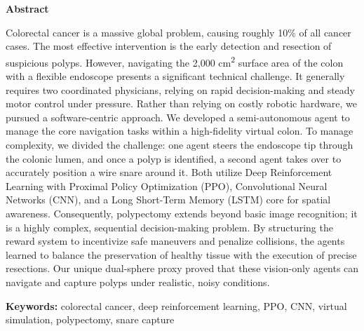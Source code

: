 
\clearpage
{}
{}

\begin{center}
\textbf{\Large Abstract}
\end{center}
\vspace{0.2cm}
\indent Colorectal cancer is a massive global problem, causing roughly 10\% of all cancer cases. The most effective intervention is the early detection and resection of suspicious polyps. However, navigating the 2,000 cm\textsuperscript{2} surface area of the colon with a flexible endoscope presents a significant technical challenge. It generally requires two coordinated physicians, relying on rapid decision-making and steady motor control under pressure. Rather than relying on costly robotic hardware, we pursued a software-centric approach. We developed a semi-autonomous agent to manage the core navigation tasks within a high-fidelity virtual colon. To manage complexity, we divided the challenge: one agent steers the endoscope tip through the colonic lumen, and once a polyp is identified, a second agent takes over to accurately position a wire snare around it. Both utilize Deep Reinforcement Learning with Proximal Policy Optimization (PPO), Convolutional Neural Networks (CNN), and a Long Short-Term Memory (LSTM) core for spatial awareness. Consequently, polypectomy extends beyond basic image recognition; it is a highly complex, sequential decision-making problem. By structuring the reward system to incentivize safe maneuvers and penalize collisions, the agents learned to balance the preservation of healthy tissue with the execution of precise resections. Our unique dual-sphere proxy proved that these vision-only agents can navigate and capture polyps under realistic, noisy conditions.

\vspace{0.5cm}
\noindent\textbf{Keywords:} colorectal cancer, deep reinforcement learning, PPO, CNN, virtual simulation, polypectomy, snare capture

